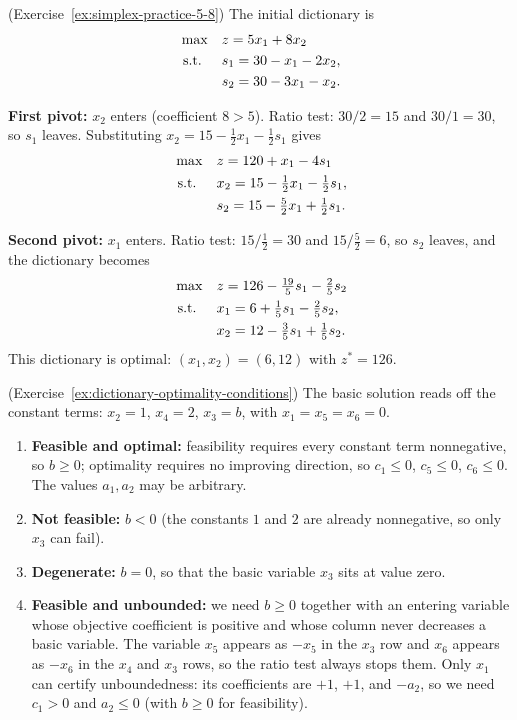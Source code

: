 \begin{solution}(Exercise~\ref{ex:simplex-practice-5-8})
The initial dictionary is
\[
\begin{aligned}
\max\quad & z = 5x_1 + 8x_2 \\
\mbox{ s.t. }\quad & s_1 = 30 - x_1 - 2x_2, \\
         & s_2 = 30 - 3x_1 - x_2.
\end{aligned}
\]

\textbf{First pivot:} $x_2$ enters (coefficient $8 > 5$).  Ratio test: $30/2 = 15$ and $30/1 = 30$, so $s_1$ leaves.  Substituting $x_2 = 15 - \tfrac12 x_1 - \tfrac12 s_1$ gives
\[
\begin{aligned}
\max\quad & z = 120 + x_1 - 4s_1 \\
\mbox{ s.t. }\quad & x_2 = 15 - \tfrac12 x_1 - \tfrac12 s_1, \\
         & s_2 = 15 - \tfrac52 x_1 + \tfrac12 s_1.
\end{aligned}
\]

\textbf{Second pivot:} $x_1$ enters.  Ratio test: $15/\tfrac12 = 30$ and $15/\tfrac52 = 6$, so $s_2$ leaves, and the dictionary becomes
\[
\begin{aligned}
\max\quad & z = 126 - \tfrac{19}{5} s_1 - \tfrac{2}{5} s_2 \\
\mbox{ s.t. }\quad & x_1 = 6 + \tfrac15 s_1 - \tfrac25 s_2, \\
         & x_2 = 12 - \tfrac35 s_1 + \tfrac15 s_2.
\end{aligned}
\]
This dictionary is optimal: $(x_1, x_2) = (6, 12)$ with $z^* = 126$.
\end{solution}
\vspace{1cm}

\begin{solution}(Exercise~\ref{ex:dictionary-optimality-conditions})
The basic solution reads off the constant terms: $x_2 = 1$, $x_4 = 2$, $x_3 = b$, with $x_1 = x_5 = x_6 = 0$.

\begin{enumerate}
\item \textbf{Feasible and optimal:} feasibility requires every constant term nonnegative, so $b \geq 0$; optimality requires no improving direction, so $c_1 \leq 0$, $c_5 \leq 0$, $c_6 \leq 0$.  The values $a_1, a_2$ may be arbitrary.
\item \textbf{Not feasible:} $b < 0$ (the constants $1$ and $2$ are already nonnegative, so only $x_3$ can fail).
\item \textbf{Degenerate:} $b = 0$, so that the basic variable $x_3$ sits at value zero.
\item \textbf{Feasible and unbounded:} we need $b \geq 0$ together with an entering variable whose objective coefficient is positive and whose column never decreases a basic variable.  The variable $x_5$ appears as $-x_5$ in the $x_3$ row and $x_6$ appears as $-x_6$ in the $x_4$ and $x_3$ rows, so the ratio test always stops them.  Only $x_1$ can certify unboundedness: its coefficients are $+1$, $+1$, and $-a_2$, so we need $c_1 > 0$ and $a_2 \leq 0$ (with $b \geq 0$ for feasibility).
\end{enumerate}
\end{solution}
\vspace{1cm}

